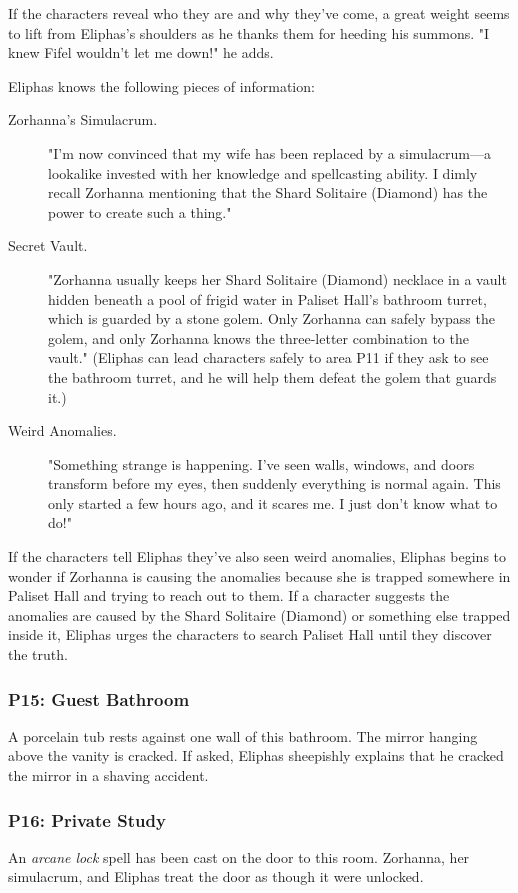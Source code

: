 \documentclass[10pt,a4paper,twoside,bg=print,twocolumn,openany,nodeprecatedcode]{dndbook}
\begin{document}
If the characters reveal who they are and why they've come, a great weight seems to lift from Eliphas's shoulders as he thanks them for heeding his summons. "I knew Fifel wouldn't let me down!" he adds.

Eliphas knows the following pieces of information:


\begin{description}
\item[Zorhanna's Simulacrum.]
"I'm now convinced that my wife has been replaced by a simulacrum—a lookalike invested with her knowledge and spellcasting ability. I dimly recall Zorhanna mentioning that the Shard Solitaire (Diamond) has the power to create such a thing."
\item[Secret Vault.]
"Zorhanna usually keeps her Shard Solitaire (Diamond) necklace in a vault hidden beneath a pool of frigid water in Paliset Hall's bathroom turret, which is guarded by a stone golem. Only Zorhanna can safely bypass the golem, and only Zorhanna knows the three-letter combination to the vault." (Eliphas can lead characters safely to area P11 if they ask to see the bathroom turret, and he will help them defeat the golem that guards it.)
\item[Weird Anomalies.]
"Something strange is happening. I've seen walls, windows, and doors transform before my eyes, then suddenly everything is normal again. This only started a few hours ago, and it scares me. I just don't know what to do!"
\end{description}

If the characters tell Eliphas they've also seen weird anomalies, Eliphas begins to wonder if Zorhanna is causing the anomalies because she is trapped somewhere in Paliset Hall and trying to reach out to them. If a character suggests the anomalies are caused by the Shard Solitaire (Diamond) or something else trapped inside it, Eliphas urges the characters to search Paliset Hall until they discover the truth.

\subsubsection{P15: Guest Bathroom}
A porcelain tub rests against one wall of this bathroom. The mirror hanging above the vanity is cracked. If asked, Eliphas sheepishly explains that he cracked the mirror in a shaving accident.

\subsubsection{P16: Private Study}
An \textit{arcane lock} spell has been cast on the door to this room. Zorhanna, her simulacrum, and Eliphas treat the door as though it were unlocked.
\end{document}
